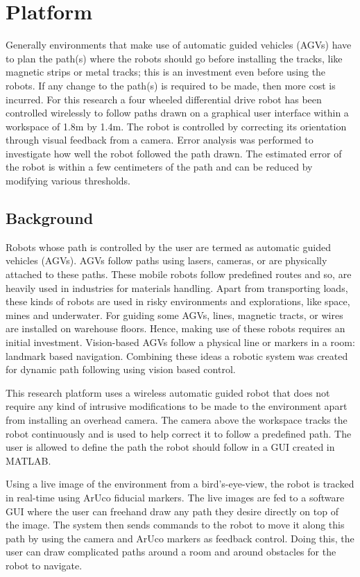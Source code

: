 \documentclass[12pt,american]{report}
\begin{document}
\chapter{Platform}
Generally environments that make use of automatic guided vehicles (AGVs) have to plan the path(s) where the robots should go before installing the tracks, like magnetic strips or metal tracks; this is an investment even before using the robots. If any change to the path(s) is required to be made, then more cost is incurred. For this research a four wheeled differential drive robot has been controlled wirelessly to follow paths drawn on a graphical user interface within a workspace of 1.8m by 1.4m. The robot is controlled by correcting its orientation through visual feedback from a camera. Error analysis was performed to investigate how well the robot followed the path drawn. The estimated error of the robot is within a few centimeters of the path and can be reduced by modifying various thresholds.

\section{Background}
Robots whose path is controlled by the user are termed as automatic guided vehicles (AGVs). AGVs follow paths using lasers, cameras, or are physically attached to these paths. These mobile robots follow predefined routes and so, are heavily used in industries for materials handling. Apart from transporting loads, these kinds of robots are used in risky environments and explorations, like space, mines and underwater. For guiding some AGVs, lines, magnetic tracts, or wires are installed on warehouse floors. Hence, making use of these robots requires an initial investment. Vision-based AGVs follow a physical line or markers in a room: landmark based navigation.  Combining these ideas a robotic system was created for dynamic path following using vision based control.  

This research platform uses a wireless automatic guided robot that does not require any kind of intrusive modifications to be made to the environment apart from installing an overhead camera. The camera above the workspace tracks the robot continuously and is used to help correct it to follow a predefined path. The user is allowed to define the path the robot should follow in a GUI created in MATLAB.

Using a live image of the environment from a bird's-eye-view, the robot is tracked in real-time using ArUco fiducial markers.  The live images are fed to a software GUI where the user can freehand draw any path they desire directly on top of the image.  The system then sends commands to the robot to move it along this path by using the camera and ArUco markers as feedback control. Doing this, the user can draw complicated paths around a room and around obstacles for the robot to navigate. 
\end{document}
